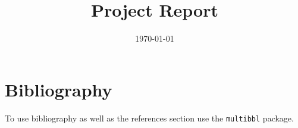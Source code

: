 \documentclass[sotoncolour]{uosthesis}  %
\title       {Project Report}
\date        {\today}
\begin{document}
\raggedright           %

\frontmatter
\maketitle
\begin{abstract}

\end{abstract}
\tableofcontents
\listoffigures
\listoftables
{} %
\lstlistoflistings
\listofaddmaterial
\mainmatter





\appendix

\backmatter


\chapter{Bibliography}
To use bibliography as well as the references section use the \texttt{multibbl} package.
\end{document}
